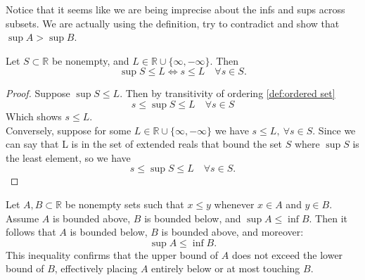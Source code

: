 \documentclass[../main.tex]{subfiles}
\begin{document}
\begin{remark}
Notice that it seems like we are being imprecise about the infs and sups across subsets. We are actually using the definition, try to contradict and show that $ \sup A > \sup B$.
\end{remark}




















\begin{proposition}
Let \( S \subset \mathbb{R} \) be nonempty, and \( L \in \mathbb{R} \cup \{\infty, -\infty\} \). Then 
\[
\sup S \leq L \iff s \leq L \quad \forall s \in S.
\]

\end{proposition}






\begin{proof}
Suppose \(\sup{S} \leq L\). Then by transitivity of ordering \ref{def:ordered set}
\[
s \leq \sup{S} \leq L  \quad \forall s \in S
\]
Which shows \(s \leq L\).\\
Conversely, suppose for some  \( L \in \mathbb{R} \cup \{\infty, -\infty\} \) we have \(s \leq L, \ \forall s \in S\). Since we can say that L is in the set of extended reals that bound the set \(S\) where \(\sup S\) is the least element, so we have
\[
s \leq \sup S \leq L \quad \forall s \in S.
\]
 
\end{proof}









\begin{exercise} \label{ex:bound_compare}
Let \( A, B \subset \mathbb{R} \) be nonempty sets such that \( x \leq y \) whenever \( x \in A \) and \( y \in B \). Assume \( A \) is bounded above, \( B \) is bounded below, and \( \sup A \leq \inf B \). Then it follows that \( A \) is bounded below, \( B \) is bounded above, and moreover:
\[
\sup A \leq \inf B.
\]
This inequality confirms that the upper bound of \( A \) does not exceed the lower bound of \( B \), effectively placing \( A \) entirely below or at most touching \( B \).
\end{exercise}
\end{document}
